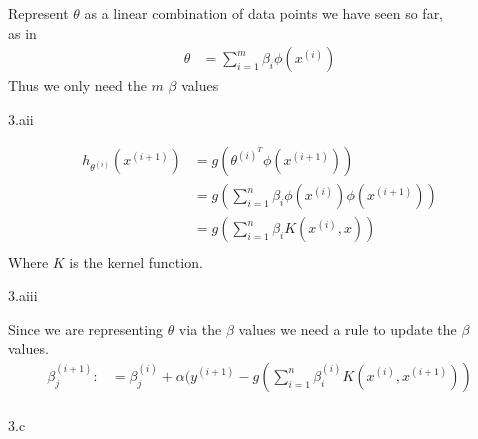  \begin{answer}
  Represent $\theta$ as a linear combination of data points we have seen so far,\\ as in 
  \begin{align*}
  \theta &= \sum_{i=1}^{m}{\beta_i \phi(x^{(i)})}
\end{align*}   
  Thus we only need the $m$ $\beta$ values
  \end{answer}

\LARGE
3.aii
\normalsize

  \begin{answer}
  \begin{align*}
  h_{\theta^{(i)}}(x^{(i+1)}) &= g(\theta^{(i)^T} \phi(x^{(i+1)}))\\
               &=  g( \sum_{i=1}^{n} \beta_i \phi(x^{(i)}) \phi(x^{(i+1)}))\\
              &=  g( \sum_{i=1}^{n} \beta_i K(x^{(i)}, x))\\
  \end{align*}
    Where $K$ is the kernel function.  
  \end{answer}

\LARGE
3.aiii
\normalsize

  \begin{answer}
  Since we are representing $\theta$ via the $\beta$ values we need a rule to update 
  the $\beta$ values.
  \begin{align*}
  \beta_j^{(i+1)} :&= \beta_j^{(i)} + \alpha(y^{(i+1)} - g( \sum_{i=1}^{n} \beta_i^{(i)} K(x^{(i)}, x^{(i+1)}))\\
  \end{align*}

  \end{answer}

\LARGE
3.c
\normalsize

  \begin{answer}
  \end{answer}
\clearpage


